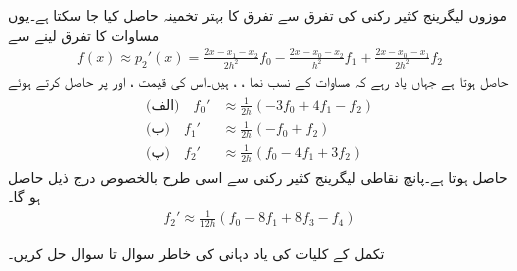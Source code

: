 موزوں لیگرینج کثیر رکنی کی تفرق سے تفرق کا بہتر تخمینہ حاصل کیا جا سکتا ہے۔یوں مساوات  کا تفرق لینے سے
\begin{align*}
f(x)\approx p_2'(x)=\frac{2x-x_1-x_2}{2h^2}f_0-\frac{2x-x_0-x_2}{h^2}f_1+\frac{2x-x_0-x_1}{2h^2}f_2
\end{align*}
حاصل ہوتا ہے جہاں یاد رہے کہ  مساوات  کے نسب نما ، ،  ہیں۔اس کی قیمت ،  اور  پر حاصل کرتے ہوئے 
\begin{gather}
\begin{aligned}\label{مساوات+اعدادی_تین_نقطی_کلیہ}
\text{(الف)}\quad f_0' &\approx \frac{1}{2h}(-3f_0+4f_1-f_2)\\
\text{(ب)}\quad f_1' &\approx \frac{1}{2h}(-f_0+f_2)\\
\text{(پ)}\quad f_2' &\approx \frac{1}{2h}(f_0-4f_1+3f_2)
\end{aligned}
\end{gather}
حاصل ہوتا ہے۔پانچ نقاطی لیگرینج کثیر رکنی سے اسی طرح  بالخصوص درج ذیل حاصل ہو گا۔
\begin{align}\label{مساوات_اعدادی_لیگرینج_پانچ_نقطی_کلیہ}
f_2'\approx \frac{1}{12h}(f_0-8f_1+8f_3-f_4)
\end{align} 

تکمل کے کلیات کی یاد دہانی کی خاطر سوال  تا سوال  حل کریں۔

